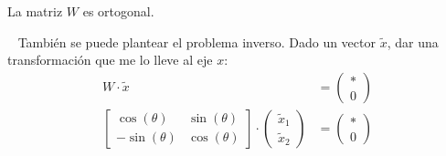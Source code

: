 \documentclass[]{article}
\begin{document}

\begin{obs}
	La matriz $W$ es ortogonal.
\end{obs}

~\newline
También se puede plantear el problema inverso. Dado un vector $\tilde{x}$, dar una transformación que me lo lleve al eje $x$:
\begin{align*}
	W \cdot \tilde x &= \begin{pmatrix}
		*\\0
	\end{pmatrix}\\
	\begin{bmatrix}
		\cos(\theta) & \sin(\theta)\\
		-\sin(\theta) & \cos(\theta)
	\end{bmatrix}\cdot \begin{pmatrix}
		\tilde x_1 \\ \tilde x_2
	\end{pmatrix} &= \begin{pmatrix}
		*\\0
	\end{pmatrix}
\end{align*}
\end{document}
